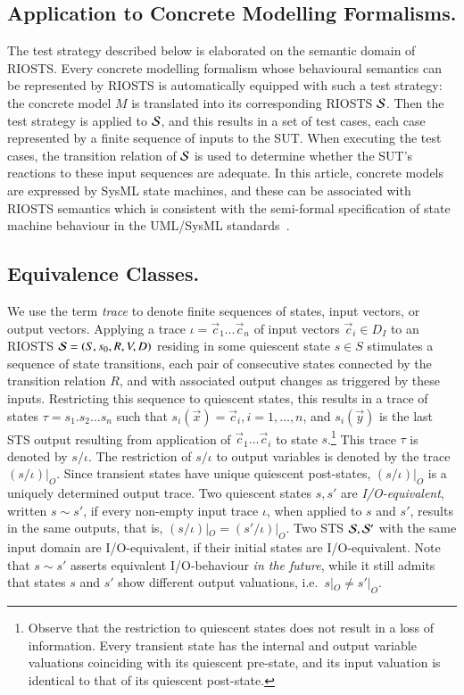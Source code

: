 \subsection{Application to Concrete Modelling Formalisms.} 
The test strategy described below is elaborated on the semantic domain of RIOSTS. Every concrete
modelling formalism whose behavioural semantics can be represented by RIOSTS is automatically 
equipped with such a test strategy: the concrete model $M$ is translated into its corresponding RIOSTS ${\cal S}$. Then the test strategy is applied to ${\cal S}$, and this results in a set of test cases, each case represented by a finite sequence of inputs to the SUT. When executing the test cases, 
the transition relation of ${\cal S}$ is used to determine whether the SUT's reactions to these
input sequences are adequate. In this article, concrete models are expressed by SysML state machines,
and these can be associated with RIOSTS semantics which is consistent with the semi-formal specification of state machine behaviour in the UML/SysML standards~\cite{uml_2_4,SysML12}.




\subsection{Equivalence Classes.}
We use the term {\it trace} to denote finite sequences of states, input vectors, or output vectors.
Applying a trace $\iota = \vec c_1\dots\vec c_n$ 
of input vectors $\vec c_i\in D_I$ to an RIOSTS ${\cal S} = (S,s_0,R,V,D)$  residing in some quiescent state
$s\in S$ stimulates a sequence of state transitions, each pair of consecutive states
connected by the transition relation $R$, and with associated  output changes  
as triggered by these inputs. 
Restricting this   sequence to quiescent states, this results in
a trace of states
$\tau = s_1.s_2\dots s_n$ such that $s_i(\vec x) = \vec c_i, i = 1,\dots,n$, and
$s_i(\vec y)$ is the last STS output resulting from application of $\vec c_1\dots\vec c_i$ 
to state $s$.\footnote{Observe that the restriction to quiescent states does not result in a loss
of information. Every transient state has the internal and output variable valuations coinciding with its quiescent pre-state, and its input valuation is identical to that of its quiescent
post-state.} This trace $\tau$ is  denoted by $s/\iota$. The restriction of $s/\iota$ to output variables is denoted by the trace $(s/\iota)|_O$.
Since transient states have unique quiescent post-states, $(s/\iota)|_O$ is a uniquely determined
output trace.
Two quiescent states $s, s'$ are {\it I/O-equivalent}, written $s\sim s'$, 
if every non-empty input trace $\iota$, when applied to $s$ and $s'$, results in the same outputs, that is,  
$(s/\iota)|_O = (s'/\iota)|_O$. Two STS ${\cal S}, {\cal S}'$ with the same input domain are I/O-equivalent, if their initial states 
are I/O-equivalent.
Note that  $s\sim s'$ asserts equivalent I/O-behaviour {\it in the future}, while it still admits that states $s$ and $s'$ show different output valuations, i.e.~$s|_O \neq s'|_O$. 
 

